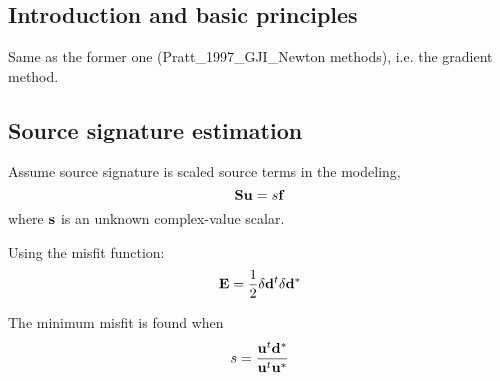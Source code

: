 \renewcommand{\pmk}{Pratt\_1999\_Geophy\_Frequency domain inversion}
\renewcommand{\prf}{FWI/\pmk.pdf}
\renewcommand{\pti}{Seismic waveform inversion in the frequency domain,
Part 1: Theory and verification in a physical scale model}
\renewcommand{\pay}{R. Gerhard Pratt, 1999}
\renewcommand{\pjo}{Geophysics}
\renewcommand{\pda}{2016/9/14 Wen.}

\section{\pinfo}
\subsection{Introduction and basic principles}
Same as the former one (Pratt\_1997\_GJI\_Newton methods),
i.e. the gradient method.

\subsection{Source signature estimation}
Assume source signature is scaled source terms in the modeling,
\[ \mathbf{S}\mathbf{u}=s\mathbf{f}\]
where $\mathbf{s}$ is an unknown complex-value scalar.

Using the misfit function:
\[ \mathbf{E}=\frac{1}{2}\delta\mathbf{d}^t\delta\mathbf{d}^* \]

The minimum misfit is found when
\[ s=\frac{\mathbf{u}^t\mathbf{d}^*}{\mathbf{u}^t\mathbf{u}^*} \]

